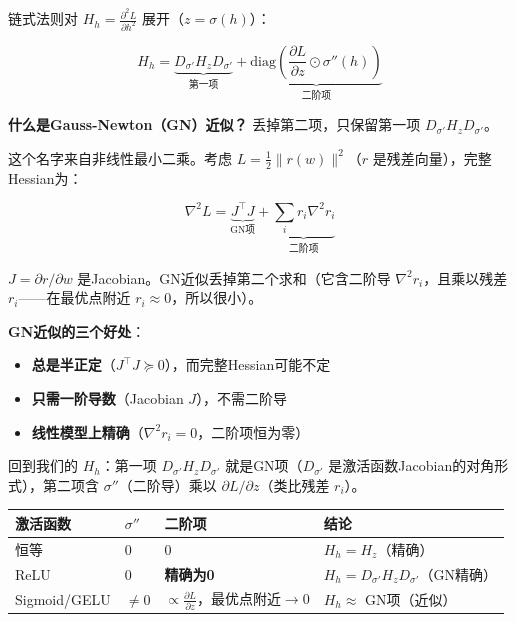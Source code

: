 \documentclass[12pt,a4paper]{article}
\begin{document}
链式法则对 $H_h = \frac{\partial^2 L}{\partial h^2}$ 展开（$z = \sigma(h)$）：


\[H_h = \underbrace{D_{\sigma'} H_z D_{\sigma'}}_{\text{第一项}} + \underbrace{\text{diag}\!\left(\frac{\partial L}{\partial z} \odot \sigma''(h)\right)}_{\text{二阶项}}\]

\textbf{什么是Gauss-Newton（GN）近似？} 丢掉第二项，只保留第一项 $D_{\sigma'} H_z D_{\sigma'}$。

这个名字来自非线性最小二乘。考虑 $L = \frac{1}{2}\|r(w)\|^2$（$r$ 是残差向量），完整Hessian为：

\[\nabla^2 L = \underbrace{J^\top J}_{\text{GN项}} + \underbrace{\sum_i r_i \nabla^2 r_i}_{\text{二阶项}}\]

$J = \partial r / \partial w$ 是Jacobian。GN近似丢掉第二个求和（它含二阶导 $\nabla^2 r_i$，且乘以残差 $r_i$——在最优点附近 $r_i \approx 0$，所以很小）。

\textbf{GN近似的三个好处}：
\begin{itemize}[leftmargin=*,nosep]
\item \textbf{总是半正定}（$J^\top J \succeq 0$），而完整Hessian可能不定
\item \textbf{只需一阶导数}（Jacobian $J$），不需二阶导
\item \textbf{线性模型上精确}（$\nabla^2 r_i = 0$，二阶项恒为零）
\end{itemize}

回到我们的 $H_h$：第一项 $D_{\sigma'} H_z D_{\sigma'}$ 就是GN项（$D_{\sigma'}$ 是激活函数Jacobian的对角形式），第二项含 $\sigma''$（二阶导）乘以 $\partial L/\partial z$（类比残差 $r_i$）。







\begin{center}\small
\begin{longtable}{|l|l|l|l|}
\hline
激活函数 & $\sigma''$ & 二阶项 & 结论 \\
\hline
恒等 & $0$ & $0$ & $H_h = H_z$（精确） \\
ReLU & $0$ & \textbf{精确为0} & $H_h = D_{\sigma'} H_z D_{\sigma'}$（GN精确） \\
Sigmoid/GELU & $\neq 0$ & $\propto \frac{\partial L}{\partial z}$，最优点附近$\to$0 & $H_h \approx$ GN项（近似） \\
\hline
\end{longtable}
\end{center}
\end{document}
